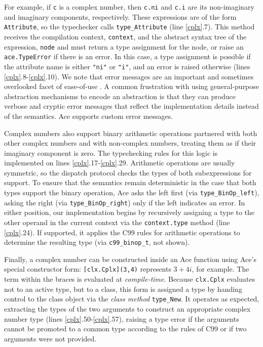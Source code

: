 \documentclass[10pt,preprint]{sigplanconf}
\begin{document}
{For example, if \verb|c| is a complex number, then \verb|c.ni| and \verb|c.i| are its non-imaginary and imaginary components, respectively. These expressions are of the form \verb|Attribute|, so the typechecker calls \verb|type_Attribute| (line \ref{cplx}.7).
This method receives the compilation context, \verb|context|, and the abstract syntax tree of the expression, \verb|node| and must return a type assignment for the node, or raise an \verb|ace.TypeError| if there is an error. In this case, a type assignment is possible if the attribute name is either \verb|"ni"| or \verb|"i"|, and an error is raised otherwise (lines \ref{cplx}.8-\ref{cplx}.10). We note that error messages are an important and sometimes overlooked facet of {ease-of-use} \cite{marceau2011measuring}. A common frustration with using general-purpose abstraction mechanisms to encode an abstraction is that they can produce  verbose and cryptic error messages that reflect the implementation details instead of the semantics. Ace supports custom error messages.%

Complex numbers also support binary arithmetic operations partnered with both other complex numbers and with non-complex numbers, treating them as if their imaginary component is zero. The typechecking rules for this logic is implemented on lines \ref{cplx}.17-\ref{cplx}.29. Arithmetic operations are usually symmetric, so the dispatch protocol checks the types of both subexpressions for support. To ensure that the semantics remain deterministic in the case that both types support the binary operation, Ace asks the left first (via \verb|type_BinOp_left|), asking the right (via \verb|type_BinOp_right|) only if the left indicates an error. In either position, our implementation begins by recursively assigning a type to the other operand in the current context via the \verb|context.type| method (line \ref{cplx}.24). If supported, it applies the C99 rules for arithmetic operations to determine the resulting type (via \verb|c99_binop_t|, not shown). 

Finally, a complex number can be constructed inside an Ace function using Ace's special constructor form: \verb|[clx.Cplx](3,4)| represents $3+4i$, for example. The term within the braces is evaluated at \emph{compile-time}. Because \verb|clx.Cplx| evaluates not to an active type, but to a class, this form is assigned a type by handing control to the class object via the \emph{class method} \verb|type_New|. It operates as expected, extracting the types of the two arguments to construct an appropriate complex number type (lines \ref{cplx}.50-\ref{cplx}.57), raising a type error if the arguments cannot be promoted to a common type according to the rules of C99 or if two arguments were not provided.%

}
\end{document}
